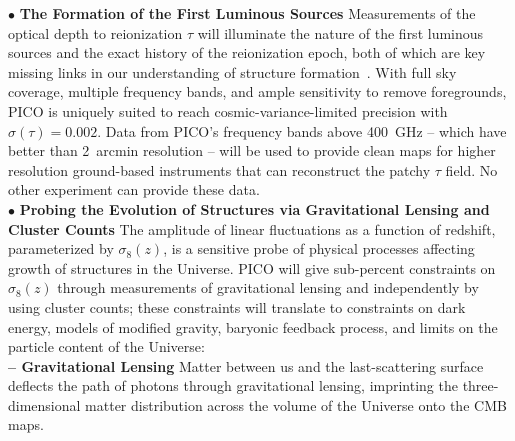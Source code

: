 \documentclass[PICOAPC.tex]{subfiles}
\begin{document}
 
$\bullet$ {\bf The Formation of the First Luminous Sources} \hspace{0.1in} \label{sec:luminoussources}  Measurements of the optical depth to reionization $\tau$ will illuminate the nature of the first luminous sources and the exact history of the reionization epoch, both of which are key missing links in our understanding of structure formation~\citep{alvarez_swp}.  With full sky coverage, multiple frequency bands, and ample sensitivity to remove foregrounds, PICO is uniquely suited to reach cosmic-variance-limited precision with $\sigma(\tau)=0.002$. Data from PICO's frequency bands above 400~GHz -- which have better than 2~arcmin resolution  -- will be used to provide clean maps for higher resolution ground-based instruments that can reconstruct the patchy $\tau$ field. No other experiment can provide these data. \\
%
$\bullet$ {\bf Probing the Evolution of Structures via Gravitational Lensing and Cluster Counts} \hspace{0.1in} \label{sec:gravitationallensing}   
The amplitude of linear fluctuations as a function of redshift, parameterized by $\sigma_8(z)$, is a sensitive probe of physical processes affecting growth of structures in the Universe. PICO will give sub-percent constraints on $\sigma_8(z)$ through measurements of gravitational lensing and independently by using cluster counts; these constraints will translate to constraints on dark energy, models of modified gravity, baryonic feedback process, and limits on the particle content of the Universe: \\
{\bf -- Gravitational Lensing} \hspace{0.1in} \label{lensing} Matter between us and the last-scattering surface deflects the path of photons through gravitational lensing, imprinting the three-dimensional matter distribution across the volume of the Universe onto the CMB maps. 
\end{document}
